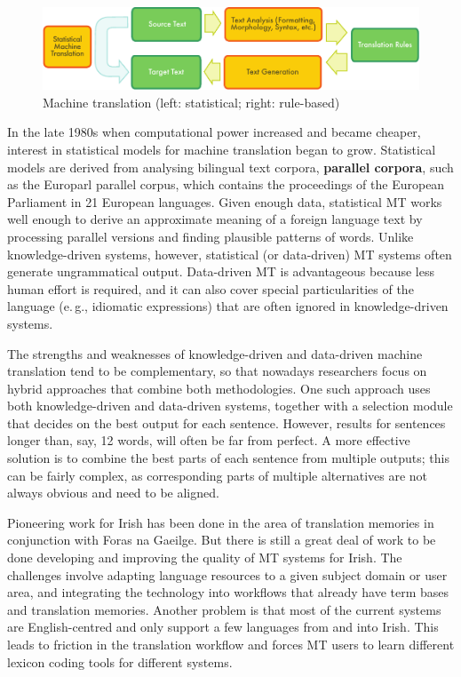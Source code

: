 \begin{multicols}{2}
\begin{figure}[htb]
  \center
  \includegraphics[width=\textwidth]{../_media/english/machine_translation}
  \caption{Machine translation (left: statistical; right: rule-based)}
  \label{fig:mtarch_en}
\end{figure}

In the late 1980s when computational power increased and became cheaper, interest in statistical models for machine translation began to grow. Statistical models are derived from analysing bilingual text corpora, \textbf{parallel corpora}, such as the Europarl parallel corpus, which contains the proceedings of the European Parliament in 21 European languages. Given enough data, statistical MT works well enough to derive an approximate meaning of a foreign language text by processing parallel versions and finding plausible patterns of words. Unlike knowledge-driven systems, however, statistical (or data-driven) MT systems often generate ungrammatical output. Data-driven MT is advantageous because less human effort is required, and it can also cover special particularities of the language (e.\,g., idiomatic expressions) that are often ignored in knowledge-driven systems. 


The strengths and weaknesses of knowledge-driven and data-driven machine translation tend to be complementary, so that nowadays researchers focus on hybrid approaches that combine both methodologies. One such approach uses both knowledge-driven and data-driven systems, together with a selection module that decides on the best output for each sentence. However, results for sentences longer than, say, 12 words, will often be far from perfect. A more effective solution is to combine the best parts of each sentence from multiple outputs; this can be fairly complex, as corresponding parts of multiple alternatives are not always obvious and need to be aligned. 

Pioneering work for Irish has been done in the area of translation memories in conjunction with Foras na Gaeilge. But there is still a great deal of work to be done developing and improving the quality of MT systems for Irish. The challenges involve adapting language resources to a given subject domain or user area, and integrating the technology into workflows that already have term bases and translation memories. Another problem is that most of the current systems are English-centred and only support a few languages from and into Irish. This leads to friction in the translation workflow and forces MT users to learn different lexicon coding tools for different systems.


\end{multicols}
